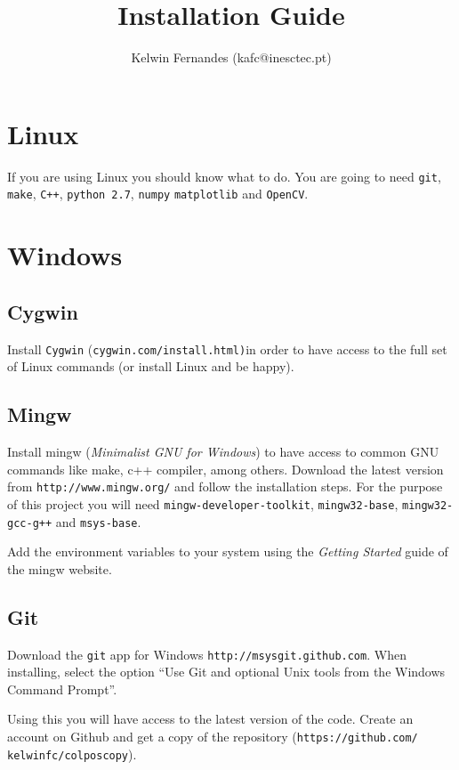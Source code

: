 \documentclass[12pt,letterpaper,onecolumn]{article}
\author{Kelwin Fernandes (kafc@inesctec.pt)}
\title{Installation Guide}
\begin{document}
\maketitle

\section{Linux}

If you are using Linux you should know what to do. You are going to need
\texttt{git}, \texttt{make}, \texttt{C++}, \texttt{python 2.7}, \texttt{numpy}
\texttt{matplotlib} and \texttt{OpenCV}.

\section{Windows}

\subsection{Cygwin}

Install \texttt{Cygwin} (\texttt{cygwin.com/install.html)}in order to have
access to the full set of Linux commands (or install Linux and be happy).

\subsection{Mingw}

Install mingw (\textit{Minimalist GNU for Windows}) to have access to common GNU
commands like make, c++ compiler, among others. Download the latest version from
\texttt{http://www.mingw.org/} and follow the installation steps. For the purpose
of this project you will need
\texttt{mingw-developer-toolkit}, \texttt{mingw32-base}, \texttt{mingw32-gcc-g++}
and \texttt{msys-base}.


Add the environment variables to your system using the \textit{Getting Started}
guide of the mingw website.

\subsection{Git}

Download the \texttt{git} app for Windows \texttt{http://msysgit.github.com}. When
installing, select the option ``Use Git and optional Unix tools from the Windows
Command Prompt''.

Using this you will have access to the latest version of the code. Create an account
on Github and get a copy of the repository
(\texttt{https://github.com/ kelwinfc/colposcopy}).
\end{document}
